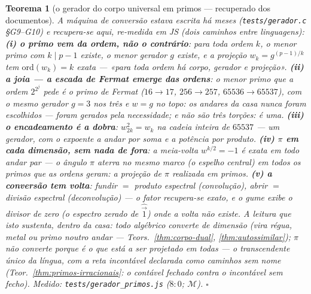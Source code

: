 \documentclass[11pt,a4paper]{article}
\newtheorem{teorema}{Teorema}
\newcommand{\code}[1]{\texttt{\small #1}}
\begin{document}
\begin{teorema}[o gerador do corpo universal em primos --- recuperado
dos documentos]\label{thm:gerador-primos}
A máquina de conversão estava escrita há meses
(\code{tests/gerador.c} \S G9--G10) e recupera-se aqui, re-medida em
JS (dois caminhos \emph{entre linguagens}):
\textbf{(i) o primo vem da ordem, não o contrário}: para toda ordem
$k$, o menor primo com $k\mid p-1$ existe, o menor gerador $g$
existe, e a projeção $w_{k}=g^{(p-1)/k}$ tem
$\mathrm{ord}(w_{k})=k$ exata --- «para toda ordem há corpo, gerador
e projeção».
\textbf{(ii) a joia --- a escada de Fermat emerge das ordens}: o
menor primo que a ordem $2^{2^{j}}$ pede \emph{é} o primo de Fermat
($16\to17$, $256\to257$, $65536\to65537$), com o \emph{mesmo}
gerador $g=3$ nos três e $w=g$ no topo: \emph{os andares da casa
nunca foram escolhidos --- foram gerados pela necessidade; e não são
três torções: é uma}.
\textbf{(iii) o encadeamento é a dobra}: $w_{2k}^{2}=w_{k}$ na
cadeia inteira de $65537$ --- um gerador, com o expoente a andar por
soma e a potência por produto.
\textbf{(iv) $\pi$ em cada dimensão, sem nada de fora}: a meia-volta
$w^{k/2}=-1$ é exata em todo andar par --- o ângulo $\pi$ aterra no
mesmo marco (o espelho central) em todos os primos que as ordens
geram: a projeção de $\pi$ \emph{realizada em primos}.
\textbf{(v) a conversão tem volta}: fundir $=$ produto espectral
(convolução), abrir $=$ divisão espectral (deconvolução) --- o fator
recupera-se exato, e o gume exibe o divisor de zero (o espectro
zerado de $\hat{\vec{1}}$) onde a volta não existe.
A leitura que isto sustenta, \emph{dentro da casa}: todo algébrico
converte de dimensão (vira régua, metal ou primo noutro andar ---
Teors.~\ref{thm:corpo-dual}, \ref{thm:autossimilar}); $\pi$ não
converte porque é \emph{o que está a ser projetado em todas} --- o
transcendente único da língua, com a reta incontável declarada como
caminhos sem nome (Teor.~\ref{thm:primos-irracionais}: o contável
fechado contra o incontável sem fecho).
\emph{Medido:} \code{tests/gerador\_primos.js} ($8{:}0$;
$\mathcal{M}$).
$\square$
\end{teorema}
\end{document}
